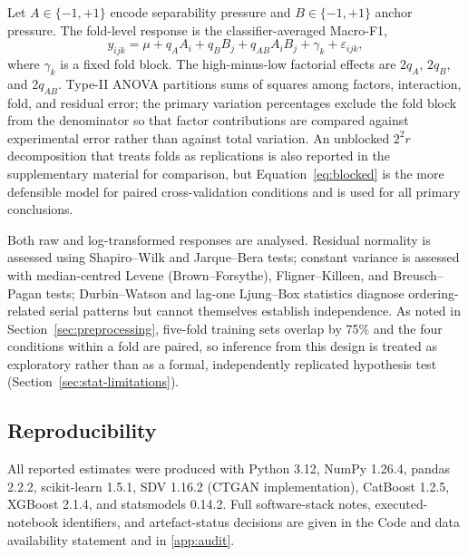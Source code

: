 Let $A \in \{-1,+1\}$ encode separability pressure and $B \in \{-1,+1\}$ anchor pressure. The fold-level response is the classifier-averaged \tstr{} Macro-F1,
\begin{equation}
y_{ijk} = \mu + q_A A_i + q_B B_j + q_{AB} A_i B_j + \gamma_k + \varepsilon_{ijk},
\label{eq:blocked}
\end{equation}
where $\gamma_k$ is a fixed fold block. The high-minus-low factorial effects are $2q_A$, $2q_B$, and $2q_{AB}$. Type-II ANOVA partitions sums of squares among factors, interaction, fold, and residual error; the primary variation percentages exclude the fold block from the denominator so that factor contributions are compared against experimental error rather than against total variation. An unblocked $2^2r$ decomposition that treats folds as replications is also reported in the supplementary material for comparison, but Equation~\ref{eq:blocked} is the more defensible model for paired cross-validation conditions and is used for all primary conclusions.

Both raw and log-transformed responses are analysed. Residual normality is assessed using Shapiro--Wilk and Jarque--Bera tests; constant variance is assessed with median-centred Levene (Brown--Forsythe), Fligner--Killeen, and Breusch--Pagan tests; Durbin--Watson and lag-one Ljung--Box statistics diagnose ordering-related serial patterns but cannot themselves establish independence. As noted in Section~\ref{sec:preprocessing}, five-fold training sets overlap by 75\% and the four conditions within a fold are paired, so inference from this design is treated as exploratory rather than as a formal, independently replicated hypothesis test (Section~\ref{sec:stat-limitations}).

\subsection{Reproducibility}
\label{sec:reproducibility-methods}

All reported estimates were produced with Python 3.12, NumPy 1.26.4, pandas 2.2.2, scikit-learn 1.5.1, SDV 1.16.2 (CTGAN implementation), CatBoost 1.2.5, XGBoost 2.1.4, and statsmodels 0.14.2. Full software-stack notes, executed-notebook identifiers, and artefact-status decisions are given in the Code and data availability statement and in \ref{app:audit}.

